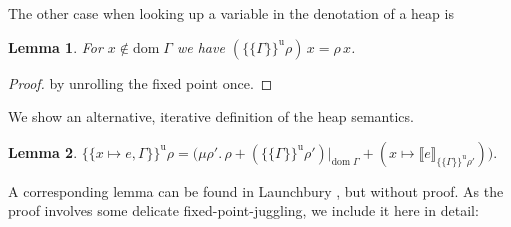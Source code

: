 \documentclass{scrartcl}
\newtheorem{lemma}{Lemma}
\theoremstyle{nonumberbreak}
\newtheorem{proof}{Proof}
\newcommand{\dom}[1]{\text{dom}\;#1}
\newcommand{\dsem}[2]{\llbracket #1 \rrbracket_{#2}}
\newcommand{\esemu}[1]{\{\!\!\!\{#1\}\!\!\!\}^{\text{u}}}
\newcommand{\shortcite}{\cite}
\begin{document}
The other case when looking up a variable in the denotation of a heap is

\begin{lemma}
\label{lem:esemu_other}
For $x \notin \dom\Gamma$ we have $(\esemu{\Gamma}\rho)\,x = \rho\, x$.
\end{lemma}

\begin{proof}
by unrolling the fixed point once.
\end{proof}

We show an alternative, iterative definition of the heap semantics.

\begin{lemma}
$
\esemu{x \mapsto e, \Gamma}\rho = \big(\mu \rho'.\,  \rho + (\esemu{\Gamma}{\rho'})|_{\dom\Gamma} + (x \mapsto \dsem{e}{\esemu{\Gamma}\rho'})\big).
$
\label{lem:iter}
\end{lemma}

A corresponding lemma can be found in Launchbury \shortcite{launchbury}, but without proof. As the proof involves some delicate fixed-point-juggling, we include it here in detail:
\end{document}
